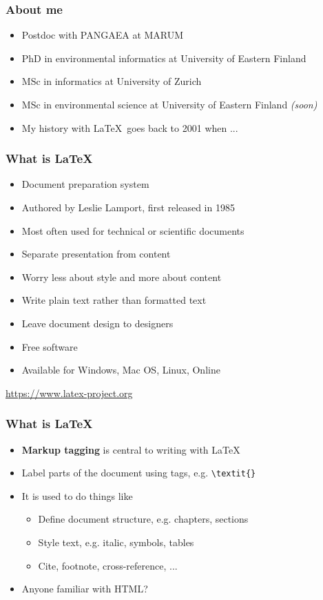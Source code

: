 \documentclass{beamer}
\begin{document}
\begin{frame}
  \frametitle{About me}
  
  \begin{itemize}
  \item Postdoc with PANGAEA at MARUM
  \item PhD in environmental informatics at University of Eastern Finland
  \item MSc in informatics at University of Zurich
  \item MSc in environmental science at University of Eastern Finland \emph{(soon)}
  \item My history with \LaTeX~goes back to 2001 when ...
  \end{itemize}
\end{frame}

\begin{frame}
  \frametitle{What is \LaTeX}
  
  \begin{itemize}
  \item Document preparation system
  \item Authored by Leslie Lamport, first released in 1985
  \item Most often used for technical or scientific documents
  \item Separate presentation from content
  \item Worry less about style and more about content
  \item Write plain text rather than formatted text
  \item Leave document design to designers
  \item Free software
  \item Available for Windows, Mac OS, Linux, Online
  \end{itemize}
  
  \begin{flushright}
  \url{https://www.latex-project.org}
  \end{flushright}
\end{frame}


\begin{frame}[fragile]
  \frametitle{What is \LaTeX}
	
  \begin{itemize}
  \item \textbf{Markup tagging} is central to writing with \LaTeX
  \item Label parts of the document using tags, e.g. \lstinline!\textit{}!
  \item It is used to do things like
  \begin{itemize}
  \item Define document structure, e.g. chapters, sections
  \item Style text, e.g. italic, symbols, tables
  \item Cite, footnote, cross-reference, ...
  \end{itemize}
  \item Anyone familiar with HTML?
  \end{itemize}
\end{frame}
\end{document}
